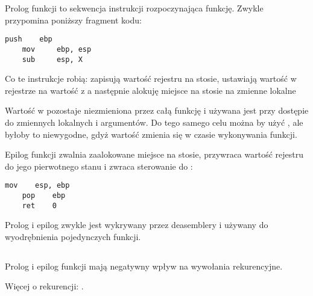 \label{sec:prologepilog}

Prolog funkcji to sekwencja instrukcji rozpoczynająca funkcję. Zwykle przypomina poniższy fragment kodu:

\begin{lstlisting}[style=customasmx86]
    push    ebp
    mov     ebp, esp
    sub     esp, X
\end{lstlisting}

Co te instrukcje robią: zapisują wartość rejestru  \EBP na stosie,
ustawiają wartość w rejestrze \EBP na wartość z \ESP a następnie alokuję miejsce na stosie na zmienne lokalne

Wartość w \EBP pozostaje niezmieniona przez całą funkcję i używana jest przy dostępie do zmiennych lokalnych i argumentów.
Do tego samego celu można by użyć \ESP, ale byłoby to niewygodne, gdyż wartość \ESP zmienia się w czasie wykonywania funkcji.

Epilog funkcji zwalnia zaalokowane miejsce na stosie, przywraca wartość rejestru \EBP do jego pierwotnego stanu
i zwraca sterowanie do :

\begin{lstlisting}[style=customasmx86]
    mov    esp, ebp
    pop    ebp
    ret    0
\end{lstlisting}

Prolog i epilog zwykle jest wykrywany przez deasemblery i używany do wyodrębnienia pojedynczych funkcji.

\subsection{\Recursion}

\myindex{\Recursion}
Prolog i epilog funkcji mają negatywny wpływ na wywołania rekurencyjne.

Więcej o rekurencji: .


